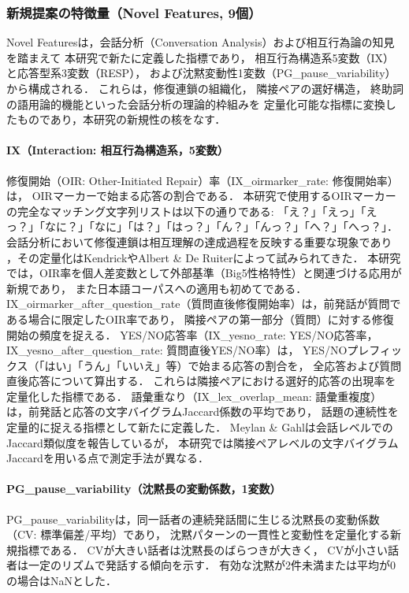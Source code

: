 \documentclass[dvipdfmx,11pt,a4paper]{bxjsarticle}
\begin{document}
\subsubsection{新規提案の特徴量（Novel Features, 9個）}
\label{sec:features_novel}

Novel Featuresは，会話分析（Conversation Analysis）および相互行為論の知見を踏まえて
本研究で新たに定義した指標であり，
相互行為構造系5変数（IX）と応答型系3変数（RESP），
および沈黙変動性1変数（PG\_pause\_variability）から構成される．
これらは，修復連鎖の組織化\cite{schegloff1977}，
隣接ペアの選好構造\cite{sacks1974}，
終助詞の語用論的機能といった会話分析の理論的枠組みを
定量化可能な指標に変換したものであり，本研究の新規性の核をなす．

\paragraph{IX（Interaction: 相互行為構造系，5変数）}
修復開始（OIR: Other-Initiated Repair）率（IX\_oirmarker\_rate: 修復開始率）は，
OIRマーカーで始まる応答の割合である．
本研究で使用するOIRマーカーの完全なマッチング文字列リストは以下の通りである:
「え？」「えっ」「えっ？」「なに？」「なに」「は？」「はっ？」「ん？」「んっ？」「へ？」「へっ？」．
会話分析において修復連鎖は相互理解の達成過程を反映する重要な現象であり
\cite{schegloff1977}，その定量化はKendrick\cite{kendrick2015}やAlbert \& De Ruiter\cite{albert2018}によって試みられてきた．
本研究では，OIR率を個人差変数として外部基準（Big5性格特性）と関連づける応用が新規であり，
また日本語コーパスへの適用も初めてである．
IX\_oirmarker\_after\_question\_rate（質問直後修復開始率）は，前発話が質問である場合に限定したOIR率であり，
隣接ペアの第一部分（質問）に対する修復開始の頻度を捉える．
YES/NO応答率（IX\_yesno\_rate: YES/NO応答率，IX\_yesno\_after\_question\_rate: 質問直後YES/NO率）は，
YES/NOプレフィックス（「はい」「うん」「いいえ」等）で始まる応答の割合を，
全応答および質問直後応答について算出する．
これらは隣接ペアにおける選好的応答の出現率を定量化した指標である．
語彙重なり（IX\_lex\_overlap\_mean: 語彙重複度）は，前発話と応答の文字バイグラムJaccard係数の平均であり，
話題の連続性を定量的に捉える指標として新たに定義した．
Meylan \& Gahl\cite{meylan2014}は会話レベルでのJaccard類似度を報告しているが，
本研究では隣接ペアレベルの文字バイグラムJaccardを用いる点で測定手法が異なる．

\paragraph{PG\_pause\_variability（沈黙長の変動係数，1変数）}
PG\_pause\_variabilityは，同一話者の連続発話間に生じる沈黙長の変動係数（CV: 標準偏差/平均）であり，
沈黙パターンの一貫性と変動性を定量化する新規指標である．
CVが大きい話者は沈黙長のばらつきが大きく，
CVが小さい話者は一定のリズムで発話する傾向を示す．
有効な沈黙が2件未満または平均が0の場合はNaNとした．
\end{document}
